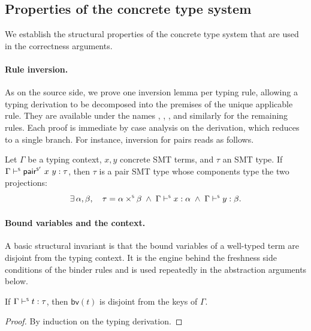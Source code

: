 \subsection{Properties of the concrete type system}

We establish the structural properties of the concrete type system that are used
in the correctness arguments.

\paragraph{Rule inversion.}
As on the source side, we prove one inversion lemma per typing rule, allowing a
typing derivation to be decomposed into the premises of the unique applicable
rule. They are available under the names
{\small{}},
{\small{}},
{\small{}},
and similarly for the remaining rules. Each proof is immediate by case analysis on
the derivation, which reduces to a single branch. For instance, inversion for pairs reads as follows.

\begin{lemma}
  Let \(\Gamma\) be a typing context, \(x, y\) concrete SMT terms, and \(\tau\)
  an SMT type. If \(\Gamma \vdash^{\scriptscriptstyle{\mathsf{S}}} \mathord{\mathsf{pair}^{\scriptscriptstyle{\mathsf{S'}}}}\ x\ y : \tau\), then \(\tau\) is a pair
  SMT type whose components type the two projections:
  \[
    \exists\,\alpha,\beta,\quad \tau = \alpha \mathbin{\times^{\scriptscriptstyle{\mathsf{S}}}} \beta \;\land\;
    \Gamma \vdash^{\scriptscriptstyle{\mathsf{S}}} x : \alpha \;\land\; \Gamma \vdash^{\scriptscriptstyle{\mathsf{S}}} y : \beta.
  \]
\end{lemma}

\paragraph{Bound variables and the context.}
A basic structural invariant is that the bound variables of a well-typed term are
disjoint from the typing context. It is the engine behind the freshness side
conditions of the binder rules and is used repeatedly in the abstraction
arguments below.

\begin{lemma}
  \label{lem:smt-bv-disjoint}
  If \(\Gamma \vdash^{\scriptscriptstyle{\mathsf{S}}} t : \tau\), then \(\mathsf{bv}(t)\) is disjoint from the
  keys of \(\Gamma\).
\end{lemma}
\begin{proof}
  By induction on the typing derivation.
\end{proof}

